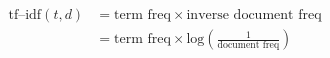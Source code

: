 \documentclass{article}
\begin{document}
\begin{align}
\text{tf--idf}(t, d)
  &= \text{term freq} \times \text{inverse document freq}  \\
  &= \text{term freq} \times \text{log}\left(\frac{1}{\text{document freq}}\right)
\end{align}
\end{document}
